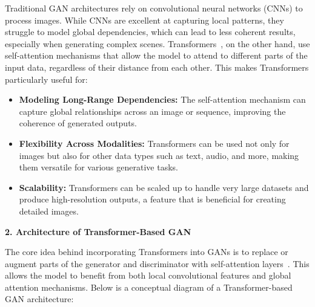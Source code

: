 Traditional GAN architectures rely on convolutional neural networks (CNNs) to process images. While CNNs are excellent at capturing local patterns, they struggle to model global dependencies, which can lead to less coherent results, especially when generating complex scenes. Transformers~\cite{vaswani2017attention}, on the other hand, use self-attention mechanisms that allow the model to attend to different parts of the input data, regardless of their distance from each other. This makes Transformers particularly useful for:
\begin{itemize}
    \item \textbf{Modeling Long-Range Dependencies:} The self-attention mechanism can capture global relationships across an image or sequence, improving the coherence of generated outputs.
    \item \textbf{Flexibility Across Modalities:} Transformers can be used not only for images but also for other data types such as text, audio, and more, making them versatile for various generative tasks.
    \item \textbf{Scalability:} Transformers can be scaled up to handle very large datasets and produce high-resolution outputs, a feature that is beneficial for creating detailed images.
\end{itemize}

\textbf{2. Architecture of Transformer-Based GAN}

The core idea behind incorporating Transformers into GANs is to replace or augment parts of the generator and discriminator with self-attention layers~\cite{khan2022transformers}. This allows the model to benefit from both local convolutional features and global attention mechanisms. Below is a conceptual diagram of a Transformer-based GAN architecture:

\begin{center}
\footnotesize
{}
\end{center}

